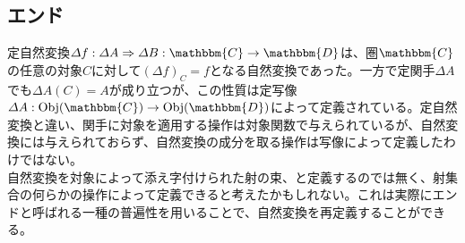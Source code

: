 \documentclass[uplatex,dvipdfmx]{jsarticle}
\newcommand{\cat}[1]{\mathbbm{#1}}
\newcommand{\arrow}{\rightarrow}
\newcommand{\natf}[5]{#1:#2\Rightarrow #3:\cat{#4}\arrow \cat{#5}}
\newcommand{\obj}[1]{\mathrm{Obj}(\cat{#1})}
\newcommand{\mor}[3]{#1:#2\arrow #3}
\numberwithin{proof}{subsection}
\begin{document}
	\subsection{エンド}
  定自然変換$\natf{\varDelta f}{\varDelta A}{\varDelta B}{C}{D}$は、圏$\cat{C}$の任意の対象$C$に対して$(\varDelta f)_C=f$となる自然変換であった。一方で定関手$\varDelta A$でも$\varDelta A(C)=A$が成り立つが、この性質は定写像$\mor{\varDelta A}{\obj{C}}{\obj{D}}$によって定義されている。定自然変換と違い、関手に対象を適用する操作は対象関数で与えられているが、自然変換には与えられておらず、自然変換の成分を取る操作は写像によって定義したわけではない。\\
  自然変換を対象によって添え字付けられた射の束、と定義するのでは無く、射集合の何らかの操作によって定義できると考えたかもしれない。これは実際にエンドと呼ばれる一種の普遍性を用いることで、自然変換を再定義することができる。\\
\end{document}

